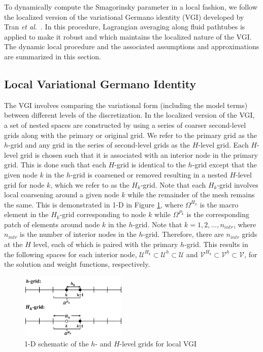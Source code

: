 To dynamically compute the Smagorinsky
parameter in a local fashion, we follow the localized version of
the variational Germano identity (VGI) developed by
Tran \textit{et al.}~\cite{bib:tran2017b}.
In this procedure, Lagrangian averaging along fluid pathtubes is applied to make it robust and which maintains the localized nature of the VGI.
The dynamic local procedure and the associated assumptions and approximations are summarized in this section.

\subsection{Local Variational Germano Identity}
\label{sec:VGI}

The VGI involves comparing the variational form (including the model terms)
between different levels of the discretization.
In the localized version of the VGI, a set of nested spaces are constructed
by using a series of coarser second-level grids
along with the primary or original grid.
We refer to the primary grid as the $h$-grid and any grid in the
series of second-level grids as the $H$-level grid.
Each $H$-level grid is chosen such that it is associated with an
interior node in the primary grid.
This is done such that each $H$-grid is identical to
the $h$-grid except that the given node $k$ in the $h$-grid is coarsened or
removed resulting in a nested $H$-level grid for node $k$, which we refer to
as the $H_k$-grid.
Note that
each $H_k$-grid involves local coarsening around a given node $k$ while the remainder of the mesh remains the same.
This is
demonstrated in 1-D in Figure \ref{fig:vgi_grid},
where $\Omega^{H_k}$ is
the macro element in the $H_k$-grid corresponding to node
$k$ while $\Omega^{P_k}$ is the corresponding patch of elements
around node $k$ in the $h$-grid.
Note that $k = 1, 2, \ldots, n_{intr}$, where $n_{intr}$ is the number
of interior nodes in the $h$-grid. Therefore, there are $n_{intr}$
grids at the $H$ level, each of which is paired with the primary $h$-grid.
This results in the following spaces for each interior node,
$\bm{\mathcal{U}}^{H_k} \subset \bm{\mathcal{U}}^h \subset \bm{\mathcal{U}}$
and
$\bm{\mathcal{V}}^{H_k} \subset \bm{\mathcal{V}}^h \subset \bm{\mathcal{V}}$,
for the solution and weight functions, respectively.

\begin{figure}[H]
\centering
\includegraphics[width=0.45\textwidth]{figures/Setup/localization_grid.pdf}
\caption{1-D schematic of the $h$- and $H$-level grids for local VGI}
\label{fig:vgi_grid}
\end{figure}

